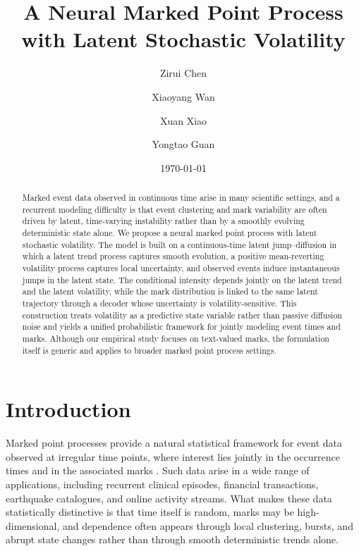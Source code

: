 \documentclass[11pt]{article}
\title{\textbf{A Neural Marked Point Process with Latent Stochastic Volatility}}
\author[1]{Zirui Chen}
\author[2]{Xiaoyang Wan}
\author[1]{Xuan Xiao}
\author[1]{Yongtao Guan}
\affil[1]{The Chinese University of Hong Kong, Shenzhen}
\affil[2]{University of Pennsylvania}
\date{\today}
\theoremstyle{definition}
\numberwithin{equation}{section}
\numberwithin{theorem}{section}
\numberwithin{proposition}{section}
\numberwithin{lemma}{section}
\numberwithin{corollary}{section}
\numberwithin{definition}{section}
\numberwithin{remark}{section}
\newcommand{\1}{\mathbbm{1}}
\begin{document}
\maketitle

\begin{abstract}
Marked event data observed in continuous time arise in many scientific settings, and a recurrent modeling difficulty is that event clustering and mark variability are often driven by latent, time-varying instability rather than by a smoothly evolving deterministic state alone. 
We propose a neural marked point process with latent stochastic volatility. 
The model is built on a continuous-time latent jump--diffusion in which a latent trend process captures smooth evolution, a positive mean-reverting volatility process captures local uncertainty, and observed events induce instantaneous jumps in the latent state. 
The conditional intensity depends jointly on the latent trend and the latent volatility, while the mark distribution is linked to the same latent trajectory through a decoder whose uncertainty is volatility-sensitive. 
This construction treats volatility as a predictive state variable rather than passive diffusion noise and yields a unified probabilistic framework for jointly modeling event times and marks. 
Although our empirical study focuses on text-valued marks, the formulation itself is generic and applies to broader marked point process settings.
\end{abstract}



\section{Introduction}

Marked point processes provide a natural statistical framework for event data observed at irregular time points, where interest lies jointly in the occurrence times and in the associated marks \citep{daleyVereJones2003, aalenBorganGjessing2008, hawkesBiometrika1971}. 
Such data arise in a wide range of applications, including recurrent clinical episodes, financial transactions, earthquake catalogues, and online activity streams. 
What makes these data statistically distinctive is that time itself is random, marks may be high-dimensional, and dependence often appears through local clustering, bursts, and abrupt state changes rather than through smooth deterministic trends alone.
\end{document}
